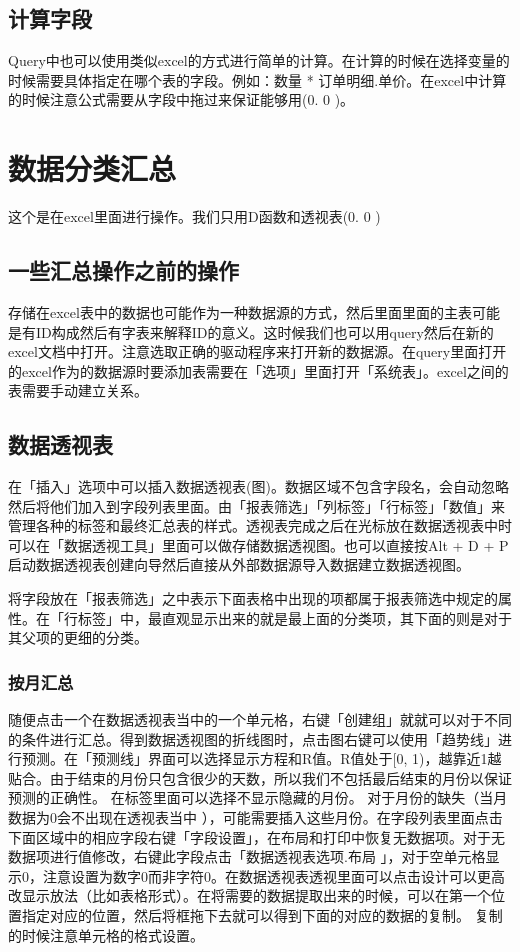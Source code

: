 \documentclass[10pt, a4paper]{article}
\begin{document}
        \subsection{计算字段}
            Query中也可以使用类似excel的方式进行简单的计算。在计算的时候在选择变量的时候需要具体指定在哪个表的字段。例如：数量 * 订单明细.单价。在excel中计算的时候注意公式需要从字段中拖过来保证能够用(0. 0 )。
    
    \section{数据分类汇总}
        这个是在excel里面进行操作。我们只用D函数和透视表(0. 0 )
        \subsection{一些汇总操作之前的操作}
        存储在excel表中的数据也可能作为一种数据源的方式，然后里面里面的主表可能是有ID构成然后有字表来解释ID的意义。这时候我们也可以用query然后在新的excel文档中打开。注意选取正确的驱动程序来打开新的数据源。在query里面打开的excel作为的数据源时要添加表需要在「选项」里面打开「系统表」。excel之间的表需要手动建立关系。

        \subsection{数据透视表}
            在「插入」选项中可以插入数据透视表(图)。数据区域不包含字段名，会自动忽略然后将他们加入到字段列表里面。由「报表筛选」「列标签」「行标签」「数值」来管理各种的标签和最终汇总表的样式。透视表完成之后在光标放在数据透视表中时可以在「数据透视工具」里面可以做存储数据透视图。也可以直接按Alt + D + P启动数据透视表创建向导然后直接从外部数据源导入数据建立数据透视图。

            将字段放在「报表筛选」之中表示下面表格中出现的项都属于报表筛选中规定的属性。在「行标签」中，最直观显示出来的就是最上面的分类项，其下面的则是对于其父项的更细的分类。

            \subsubsection{按月汇总}
            随便点击一个在数据透视表当中的一个单元格，右键「创建组」就就可以对于不同的条件进行汇总。得到数据透视图的折线图时，点击图右键可以使用「趋势线」进行预测。在「预测线」界面可以选择显示方程和R值。R值处于[0, 1)，越靠近1越贴合。由于结束的月份只包含很少的天数，所以我们不包括最后结束的月份以保证预测的正确性。 在标签里面可以选择不显示隐藏的月份。 对于月份的缺失（当月数据为0会不出现在透视表当中 ），可能需要插入这些月份。在字段列表里面点击下面区域中的相应字段右键「字段设置」，在布局和打印中恢复无数据项。对于无数据项进行值修改，右键此字段点击「数据透视表选项.布局 」，对于空单元格显示0，注意设置为数字0而非字符0。在数据透视表透视里面可以点击设计可以更高改显示放法（比如表格形式）。在将需要的数据提取出来的时候，可以在第一个位置指定对应的位置，然后将框拖下去就可以得到下面的对应的数据的复制。 复制的时候注意单元格的格式设置。
\end{document}

